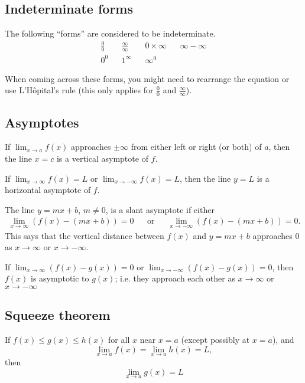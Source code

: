 \documentclass[main.tex]{subfiles}
\begin{document}
\begin{multicols}{2}
	\subsection*{Indeterminate forms}
	The following ``forms'' are considered to be indeterminate.
	\begin{align*}
		\frac{0}{0} && \frac{\infty}{\infty} && 0 \times \infty && \infty - \infty\\
		0^0 && 1^\infty && \infty^0
	\end{align*}

	When coming across these forms, you might need to rearrange the equation or use L'Hôpital's rule (this only applies for \(\frac{0}{0}\) and \(\frac{\infty}{\infty}\)).

	\subsection*{Asymptotes}
	\begin{definition}
		If \(\lim_{x \to a}{f(x)}\) approaches \(\pm \infty\) from either left or right (or both) of \(a\), then the line \(x = c\) is a vertical asymptote of \(f\).
	\end{definition}
	\begin{definition}
		If \(\lim_{x \to \infty}{f(x)} = L\) or \(\lim_{x \to -\infty}{f(x)} = L\), then the line \(y = L\) is a horizontal asymptote of \(f\).
	\end{definition}
	\begin{definition}
		The line \(y = mx + b\), \(m \neq 0\), is a slant asymptote if either
		\[
			\begin{aligned}
			\lim_{x \to \infty} (f(x) - (mx + b)) = 0 && \text{or} && \lim_{x \to -\infty} (f(x) - (mx + b)) = 0.
			\end{aligned}
		\]
		This says that the vertical distance between \(f(x)\) and \(y = mx + b\) approaches 0 as \(x \to \infty\) or \(x \to -\infty\).
	\end{definition}
	\begin{definition}
	If \(\lim_{x \to \infty} (f(x) - g(x)) = 0\) or \(\lim_{x \to -\infty} (f(x) - g(x)) = 0\), then \(f(x)\) is asymptotic to \(g(x)\); i.e. they approach each other as \(x \to \infty\) or \(x \to -\infty\)
	\end{definition}

	\subsection*{Squeeze theorem}
	\begin{theorem}
	If \(f(x) \leq g(x) \leq h(x)\) for all \(x\) near \(x = a\) (except possibly at \(x = a\)), and
	\[\lim_{x \to a}{f(x)} = \lim_{x \to a}{h(x)} = L,\] then \[\lim_{x \to a}{g(x)} = L\]
	\end{theorem}


\end{multicols}
\end{document}
